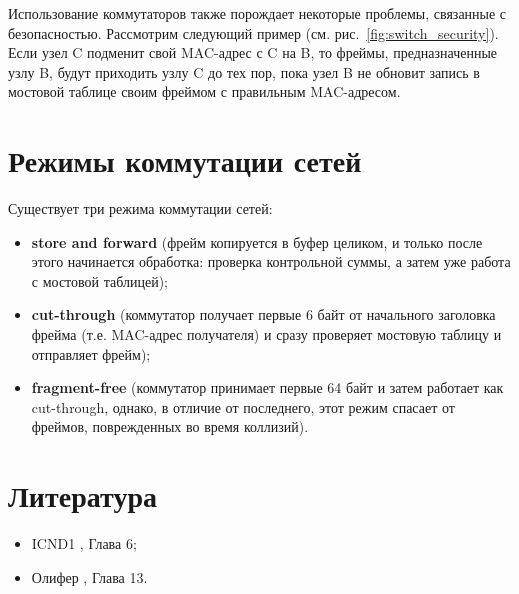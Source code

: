 Использование коммутаторов также порождает некоторые проблемы, связанные с безопасностью. Рассмотрим следующий пример (см. рис.~\ref{fig:switch_security}). Если узел C подменит свой MAC-адрес с C на B, то фреймы, предназначенные узлу B, будут приходить узлу C до тех пор, пока узел B не обновит запись в мостовой таблице своим фреймом с правильным MAC-адресом.
\section{Режимы коммутации сетей}
Существует три режима коммутации сетей:
\begin{itemize}
	\item \textbf{store and forward} (фрейм копируется в буфер целиком, и только после этого начинается обработка: проверка контрольной суммы, а затем уже работа с мостовой таблицей);
	\item \textbf{cut-through} (коммутатор получает первые 6 байт от начального заголовка фрейма (т.е. MAC-адрес получателя) и сразу проверяет мостовую таблицу и отправляет фрейм);
	\item \textbf{fragment-free} (коммутатор принимает первые 64 байт и затем работает как cut-through, однако, в отличие от последнего, этот режим спасает от фреймов, поврежденных во время коллизий).
\end{itemize}

\section{Литература}
\begin{itemize}
	\item ICND1 \cite{icnd1eng}, Глава 6;
	\item Олифер \cite{olipher}, Глава 13.
\end{itemize}